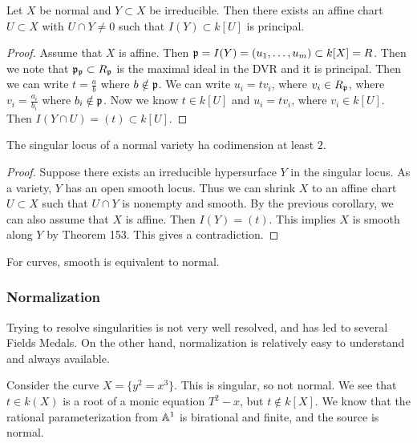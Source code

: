 \documentclass[twoside, 10pt]{article}
\begin{document}
        \begin{cor} Let $X$ be normal and $Y \subset X$ be irreducible. Then
            there exists an affine chart $U \subset X$ with $U \cap Y \neq 0$
            such that $I(Y) \subset k[U]$ is principal.  \begin{proof} Assume
                that $X$ is affine. Then $\mathfrak{p} = I(Y) = (u_1, \ldots, u_m)
                \subset k[X] = R$. Then we note that $\mathfrak{p}_{\mathfrak{p}} \subset
                R_{\mathfrak{p}}$ is the maximal ideal in the DVR and it is
                principal. Then we can write $t = \frac{a}{b}$ where $b \notin
                \mathfrak{p}$. We can write $u_i = tv_i$, where $v_i \in R_{\mathfrak{p}}$,
                where $v_i = \frac{a_i}{b_i}$ where $b_i \notin \mathfrak{p}$. Now we
                know $t \in k[U]$ and $u_i = tv_i$, where $v_i \in k[U]$. Then
            $I(Y \cap U) = (t) \subset k[U]$.  \end{proof} \end{cor}

        \begin{cor} The singular locus of a normal variety ha codimension at
            least $2$.  \begin{proof} Suppose there exists an irreducible
                hypersurface $Y$ in the singular locus. As a variety, $Y$ has
                an open smooth locus.  Thus we can shrink $X$ to an affine
                chart $U \subset X$ such that $U \cap Y$ is nonempty and
                smooth. By the previous corollary, we can also assume that $X$
                is affine. Then $I(Y) = (t)$. This implies $X$ is smooth along
                $Y$ by Theorem 153. This gives a contradiction.  \end{proof}
            \end{cor}

        \begin{cor} For curves, smooth is equivalent to normal.  \end{cor}

        \subsubsection{Normalization} Trying to resolve singularities is not
        very well resolved, and has led to several Fields Medals. On the other
        hand, normalization is relatively easy to understand and always
        available.  \begin{exm} Consider the curve $X = \{y^2=x^3\}$. This is
            singular, so not normal. We see that $t \in k(X)$ is a root of a
        monic equation $T^2-x$, but $t \notin k[X]$. We know that the rational
    parameterization from $\mathbb{A}^1$ is birational and finite, and the source is
normal.  \end{exm}
\end{document}
